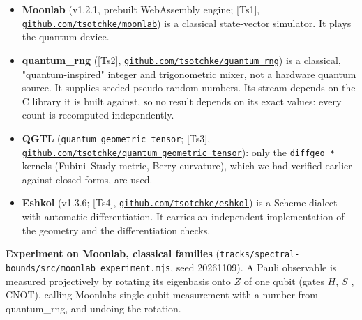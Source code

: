 \documentclass[11pt,a4paper]{article}
\providecommand{\tightlist}{\setlength{\itemsep}{0pt}\setlength{\parskip}{0pt}}
\begin{document}
\begin{itemize}
\tightlist
\item
  \textbf{Moonlab} (v1.2.1, prebuilt WebAssembly engine; {[}Ts1{]}, \href{https://github.com/tsotchke/moonlab}{\nolinkurl{github.com/tsotchke/moonlab}}) is a classical state-vector simulator. It plays
  the quantum device.
\item
  \textbf{quantum\_rng} ({[}Ts2{]}, \href{https://github.com/tsotchke/quantum_rng}{\nolinkurl{github.com/tsotchke/quantum_rng}}) is a classical, "quantum-inspired" integer and trigonometric mixer, not a hardware
  quantum source. It supplies seeded pseudo-random numbers. Its stream depends on the C library it is
  built against, so no result depends on its exact values: every count is recomputed independently.
\item
  \textbf{QGTL} (\nolinkurl{quantum_geometric_tensor}; {[}Ts3{]}, \href{https://github.com/tsotchke/quantum_geometric_tensor}{\nolinkurl{github.com/tsotchke/quantum_geometric_tensor}}): only the \texttt{diffgeo\_*} kernels (Fubini--Study metric, Berry
  curvature), which we had verified earlier against closed forms, are used.
\item
  \textbf{Eshkol} (v1.3.6; {[}Ts4{]}, \href{https://github.com/tsotchke/eshkol}{\nolinkurl{github.com/tsotchke/eshkol}}) is a Scheme dialect with automatic differentiation. It carries an independent
  implementation of the geometry and the differentiation checks.
\end{itemize}

\textbf{Experiment on Moonlab, classical families} (\nolinkurl{tracks/spectral-bounds/src/moonlab_experiment.mjs}, seed 20261109). A Pauli
observable is measured projectively by rotating its eigenbasis onto \(Z\) of one qubit (gates \(H\),
\(S^\dagger\), CNOT), calling Moonlab\textquotesingle s single-qubit measurement with a number from quantum\_rng, and
undoing the rotation.
\end{document}
